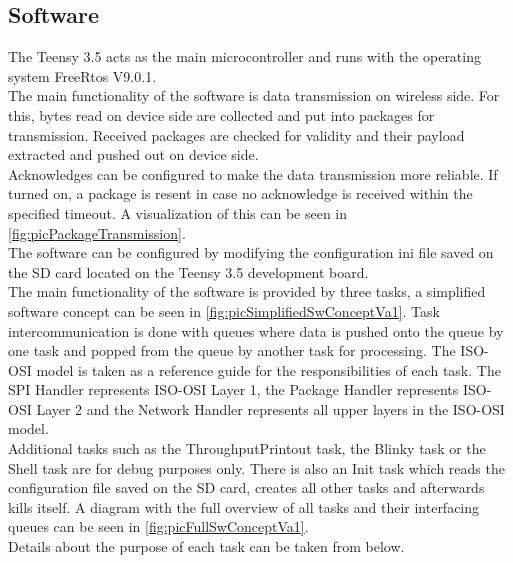 \subsection{Software}
The Teensy 3.5 acts as the main microcontroller and runs with the operating system FreeRtos V9.0.1.\\
The main functionality of the software is data transmission on wireless side. For this, bytes read on device side are collected and put into packages for transmission. Received packages are checked for validity and their payload extracted and pushed out on device side.\\
Acknowledges can be configured to make the data transmission more reliable. If turned on, a package is resent in case no acknowledge is received within the specified timeout. A visualization of this can be seen in \autoref{fig:picPackageTransmission}.\\
%
%
The software can be configured by modifying the configuration ini file saved on the SD card located on the Teensy 3.5 development board.\\
The main functionality of the software is provided by three tasks, a simplified software concept can be seen in \autoref{fig:picSimplifiedSwConceptVa1}. Task intercommunication is done with queues where data is pushed onto the queue by one task and popped from the queue by another task for processing. The ISO-OSI model is taken as a reference guide for the responsibilities of each task. The SPI Handler represents ISO-OSI Layer 1, the Package Handler represents ISO-OSI Layer 2 and the Network Handler represents all upper layers in the ISO-OSI model.\\
Additional tasks such as the ThroughputPrintout task, the Blinky task or the Shell task are for debug purposes only. There is also an Init task which reads the configuration file saved on the SD card, creates all other tasks and afterwards kills itself. A diagram with the full overview of all tasks and their interfacing queues can be seen in \autoref{fig:picFullSwConceptVa1}.\\
Details about the purpose of each task can be taken from below. 
%
